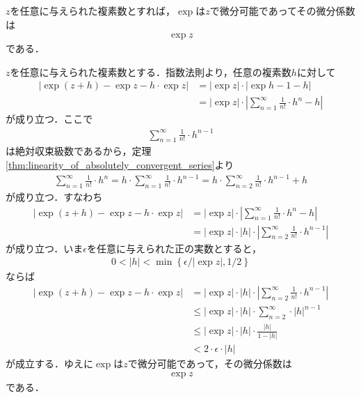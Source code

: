 	\begin{screen}
		\begin{thm}[指数関数は各点で微分可能]
			$z$を任意に与えられた複素数とすれば，$\exp$は$z$で微分可能であってその微分係数は
			\begin{align}
				\exp{z}
			\end{align}
			である．
		\end{thm}
	\end{screen}
	
	\begin{sketch}
		$z$を任意に与えられた複素数とする．指数法則より，任意の複素数$h$に対して
		\begin{align}
			|\exp{(z+h)} - \exp{z} - h \cdot \exp{z}|
			&= |\exp{z}| \cdot |\exp{h} - 1 - h| \\
			&= |\exp{z}| \cdot \left|\sum_{n=1}^\infty \frac{1}{n!} \cdot h^n - h\right|
		\end{align}
		が成り立つ．ここで
		\begin{align}
			\sum_{n=1}^\infty \frac{1}{n!} \cdot h^{n-1}
		\end{align}
		は絶対収束級数であるから，定理\ref{thm:linearity_of_absolutely_convergent_series}より
		\begin{align}
			\sum_{n=1}^\infty \frac{1}{n!} \cdot h^{n}
			= h \cdot \sum_{n=1}^\infty \frac{1}{n!} \cdot h^{n-1}
			= h \cdot \sum_{n=2}^\infty \frac{1}{n!} \cdot h^{n-1} + h
		\end{align}
		が成り立つ．すなわち
		\begin{align}
			|\exp{(z+h)} - \exp{z} - h \cdot \exp{z}|
			&= |\exp{z}| \cdot \left|\sum_{n=1}^\infty \frac{1}{n!} \cdot h^n - h\right| \\
			&= |\exp{z}| \cdot |h| \cdot \left|\sum_{n=2}^\infty \frac{1}{n!} \cdot h^{n-1}\right|
		\end{align}
		が成り立つ．いま$\epsilon$を任意に与えられた正の実数とすると，
		\begin{align}
			0 < |h| < \min\left\{\epsilon/|\exp{z}|,1/2\right\}
		\end{align}
		ならば
		\begin{align}
			|\exp{(z+h)} - \exp{z} - h \cdot \exp{z}|
			&= |\exp{z}| \cdot |h| \cdot \left|\sum_{n=2}^\infty \frac{1}{n!} \cdot h^{n-1}\right| \\
			&\leq |\exp{z}| \cdot |h| \cdot \sum_{n=2}^\infty \cdot |h|^{n-1} \\
			&\leq |\exp{z}| \cdot |h| \cdot \frac{|h|}{1-|h|} \\
			&< 2 \cdot \epsilon \cdot |h|
		\end{align}
		が成立する．ゆえに$\exp$は$z$で微分可能であって，その微分係数は
		\begin{align}
			\exp{z}
		\end{align}
		である．
		\QED
	\end{sketch}
	
